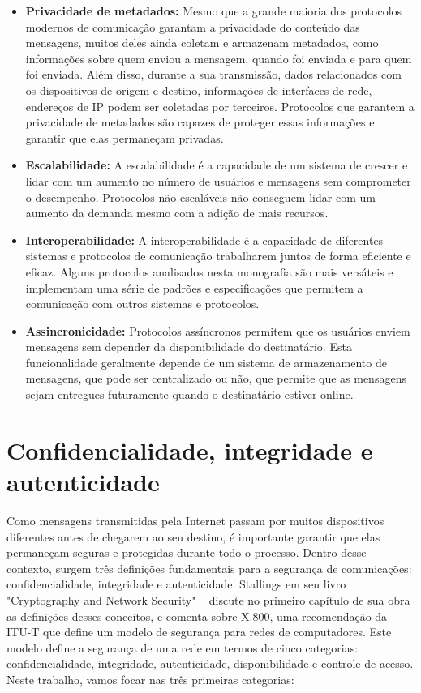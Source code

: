 \begin{itemize}
    \item \textbf{Privacidade de metadados:} Mesmo que a grande maioria dos protocolos modernos de comunicação garantam a privacidade do conteúdo das mensagens, muitos deles ainda coletam e armazenam metadados, como informações sobre quem enviou a mensagem, quando foi enviada e para quem foi enviada. Além disso, durante a sua transmissão, dados relacionados com os dispositivos de origem e destino, informações de interfaces de rede, endereços de IP podem ser coletadas por terceiros. Protocolos que garantem a privacidade de metadados são capazes de proteger essas informações e garantir que elas permaneçam privadas.
    
    \item \textbf{Escalabilidade:} A escalabilidade é a capacidade de um sistema de crescer e lidar com um aumento no número de usuários e mensagens sem comprometer o desempenho. Protocolos não escaláveis não conseguem lidar com um aumento da demanda mesmo com a adição de mais recursos.
    
    \item \textbf{Interoperabilidade:} A interoperabilidade é a capacidade de diferentes sistemas e protocolos de comunicação trabalharem juntos de forma eficiente e eficaz. Alguns protocolos analisados nesta monografia são mais versáteis e implementam uma série de padrões e especificações que permitem a comunicação com outros sistemas e protocolos.

    \item \textbf{Assincronicidade:} Protocolos assíncronos permitem que os usuários enviem mensagens sem depender da disponibilidade do destinatário. Esta funcionalidade geralmente depende de um sistema de armazenamento de mensagens, que pode ser centralizado ou não, que permite que as mensagens sejam entregues futuramente quando o destinatário estiver online.
\end{itemize}

\section{Confidencialidade, integridade e autenticidade}

Como mensagens transmitidas pela Internet passam por muitos dispositivos diferentes antes de chegarem ao seu destino, é importante garantir que elas permaneçam seguras e protegidas durante todo o processo. Dentro desse contexto, surgem três definições fundamentais para a segurança de comunicações: confidencialidade, integridade e autenticidade. Stallings em seu livro "Cryptography and Network Security" ~\cite{Stallings2017} discute no primeiro capítulo de sua obra as definições desses conceitos, e comenta sobre X.800, uma recomendação da ITU-T que define um modelo de segurança para redes de computadores. Este modelo define a segurança de uma rede em termos de cinco categorias: confidencialidade, integridade, autenticidade, disponibilidade e controle de acesso. Neste trabalho, vamos focar nas três primeiras categorias:

